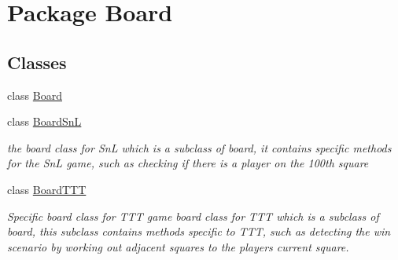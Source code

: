 \hypertarget{namespace_board}{}\section{Package Board}
\label{namespace_board}
\subsection*{Classes}
\begin{DoxyCompactItemize}
\item 
class \hyperlink{class_board_1_1_board}{Board}
\item 
class \hyperlink{class_board_1_1_board_sn_l}{Board\+Sn\+L}
\begin{DoxyCompactList}\small\item\em the board class for Sn\+L which is a subclass of board, it contains specific methods for the Sn\+L game, such as checking if there is a player on the 100th square \end{DoxyCompactList}\item 
class \hyperlink{class_board_1_1_board_t_t_t}{Board\+T\+T\+T}
\begin{DoxyCompactList}\small\item\em Specific board class for T\+T\+T game board class for T\+T\+T which is a subclass of board, this subclass contains methods specific to T\+T\+T, such as detecting the win scenario by working out adjacent squares to the players current square. \end{DoxyCompactList}\end{DoxyCompactItemize}
